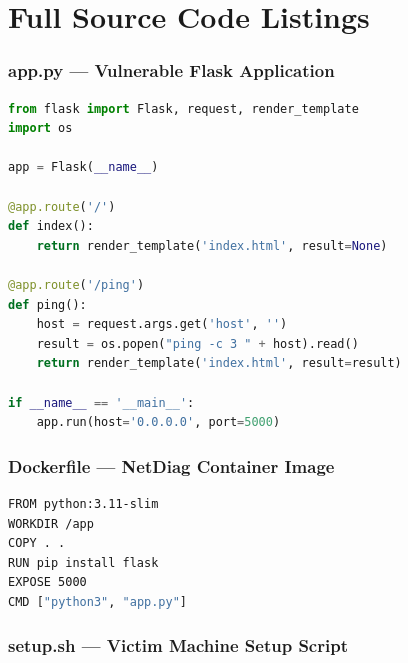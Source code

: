 \clearpage
\appendix

\chapter{Full Source Code Listings}

\subsection{app.py --- Vulnerable Flask Application}

\begin{lstlisting}[language=Python, caption={app.py --- NetDiag vulnerable web application}]
from flask import Flask, request, render_template
import os

app = Flask(__name__)

@app.route('/')
def index():
    return render_template('index.html', result=None)

@app.route('/ping')
def ping():
    host = request.args.get('host', '')
    result = os.popen("ping -c 3 " + host).read()
    return render_template('index.html', result=result)

if __name__ == '__main__':
    app.run(host='0.0.0.0', port=5000)
\end{lstlisting}

\vspace{0.5cm}

\subsection{Dockerfile --- NetDiag Container Image}

\begin{lstlisting}[language=bash, caption={Dockerfile --- builds the NetDiag vulnerable image}]
FROM python:3.11-slim
WORKDIR /app
COPY . .
RUN pip install flask
EXPOSE 5000
CMD ["python3", "app.py"]
\end{lstlisting}

\vspace{0.5cm}

\subsection{setup.sh --- Victim Machine Setup Script}

